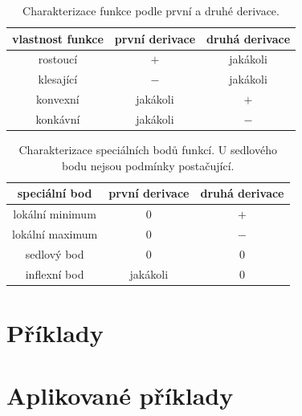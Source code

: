 \begin{table}[H]
    \centering

    \begin{tabular}{|c|c|c|}
        \hline
        vlastnost funkce & první derivace & druhá derivace \\
        \hline
        rostoucí & $+$ & jakákoli \\
        klesající & $-$ & jakákoli  \\
        konvexní & jakákoli & $+$ \\
        konkávní & jakákoli & $-$ \\ \hline
    \end{tabular}
    \caption{Charakterizace funkce podle první a druhé derivace.}
\end{table}

\begin{table}[H]
    \centering

    \begin{tabular}{|c|c|c|}
        \hline
        speciální bod & první derivace & druhá derivace \\
        \hline
        lokální minimum & $0$ & $+$ \\
        lokální maximum & $0$ & $-$ \\
        sedlový bod & $0$ & $0$ \\
        inflexní bod & jakákoli & $0$ \\ \hline
    \end{tabular}
    \caption{Charakterizace speciálních bodů funkcí. U sedlového bodu nejsou podmínky postačující.}
\end{table}

\section{Příklady}

\begin{example}
   

\end{example}

\section{Aplikované příklady}

